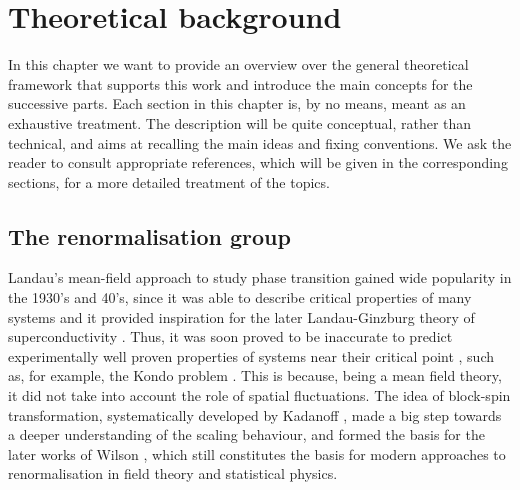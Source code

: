 \chapter{Theoretical background}
\label{chap:background}
In this chapter we want to provide an overview over the general theoretical framework that supports this work and introduce the main concepts for the successive parts. Each section in this chapter is, by no means, meant as an exhaustive treatment. The description will be quite conceptual, rather than technical, and aims at recalling the main ideas and fixing conventions. We ask the reader to consult appropriate references,  which will be given in the corresponding sections, for a more detailed treatment of the topics. \\

\section{The renormalisation group}
\label{sec:RG}
Landau's mean-field approach to study phase transition \cite{Landau:1937obd} gained wide popularity in the 1930's and 40's, since it was able to describe critical properties of many systems and it provided inspiration for the later Landau-Ginzburg theory of superconductivity \cite{ginzburg}. Thus, it was soon proved to be inaccurate to predict experimentally well proven properties of systems near their critical point \cite{Cao:1999pw,WilsonRG1}, such as, for example, the Kondo problem \cite{Hewson2009}. This is because, being a mean field theory, it did not take into account the role of spatial fluctuations.
The idea of block-spin transformation, systematically developed by Kadanoff \cite{PhysicsPhysiqueFizika_2_263}, made a big step towards a deeper understanding of the scaling behaviour, and formed the basis for the later works of Wilson \cite{WilsonRG1,WilsonRG2,WilsonFisher}, which still constitutes the basis for modern approaches to renormalisation in field theory and statistical physics.\\

